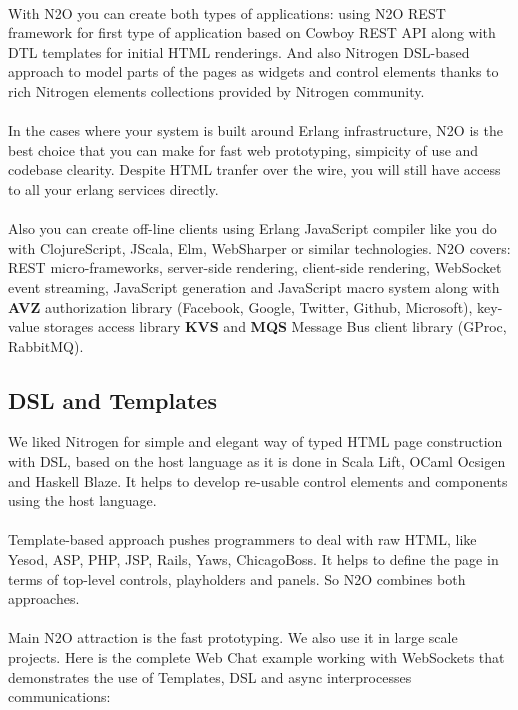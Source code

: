 \paragraph{}
With N2O you can create both types of applications: using N2O REST framework
for first type of application based on Cowboy REST API along with DTL
templates for initial HTML renderings. And also Nitrogen DSL-based approach
to model parts of the pages as widgets and control elements thanks to rich
Nitrogen elements collections provided by Nitrogen community. 
\paragraph{}
In the cases where your system is built around Erlang infrastructure, N2O
is the best choice that you can make for fast web prototyping, simpicity
of use and codebase clearity. Despite HTML tranfer over the wire,
you will still have access to all your erlang services directly.
\paragraph{}
Also you can create off-line clients using Erlang JavaScript compiler
like you do with ClojureScript, JScala, Elm, WebSharper or similar
technologies. N2O covers: REST micro-frameworks, server-side rendering,
client-side rendering, WebSocket event streaming, JavaScript generation
and JavaScript macro system along with {\bf AVZ} authorization
library (Facebook, Google, Twitter, Github, Microsoft), key-value storages
access library {\bf KVS} and {\bf MQS} Message Bus client library (GProc, RabbitMQ).

\subsection*{DSL and Templates}
We liked Nitrogen for simple and elegant way of typed HTML page
construction with DSL, based on the host language as it is done in Scala Lift,
OCaml Ocsigen and Haskell Blaze. It helps to develop re-usable control
elements and components using the host language.
\paragraph{}
Template-based approach pushes programmers to deal with raw HTML,
like Yesod, ASP, PHP, JSP, Rails, Yaws, ChicagoBoss. It helps to
define the page in terms of top-level controls, playholders
and panels. So N2O combines both approaches.
\paragraph{}
Main N2O attraction is the fast prototyping. We also use it in large
scale projects. Here is the complete Web Chat example working with
WebSockets that demonstrates the use of Templates, DSL and async
interprocesses communications:

